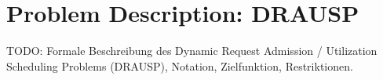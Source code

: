 \section{Problem Description: DRAUSP}
\label{sec:drausp}

TODO: Formale Beschreibung des Dynamic Request Admission / Utilization Scheduling Problems (DRAUSP), Notation, Zielfunktion, Restriktionen.
